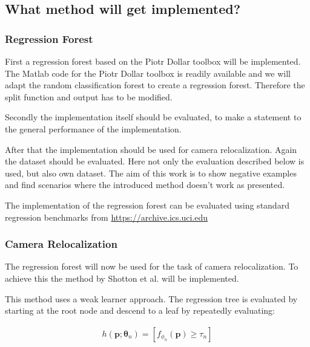 

\subsection{What method will get implemented?} %
\label{sub:what_method_will_get_implemented_}

\subsubsection*{Regression Forest} %
\label{ssub:regression_forest}

First a regression forest based on the Piotr Dollar toolbox \cite{piotr} will be implemented. The Matlab code for the Piotr Dollar toolbox is readily available and we will adapt the random classification forest to create a regression forest. Therefore the split function and output has to be modified.

Secondly the implementation itself should be evaluated, to make a statement to the general performance of the implementation.

After that the implementation should be used for camera relocalization. Again the dataset should be evaluated. Here not only the evaluation described below is used, but also own dataset. The aim of this work is to show negative examples and find scenarios where the introduced method \cite{shotton} doesn't work as presented.

The implementation of the regression forest can be evaluated using standard regression benchmarks from
\href{https://archive.ics.uci.edu/ml/datasets.html?format=&task=reg&att=&area=&numAtt=&numIns=&type=&sort=nameUp&view=table}{https://archive.ics.uci.edu}


\subsubsection{Camera Relocalization} %
\label{ssub:camera_relocalization}

The regression forest will now be used for the task of camera relocalization. To achieve this the method by Shotton et al. \cite{shotton} will be implemented.

This method uses a weak learner approach. The regression tree is evaluated by starting at the root node and descend to a leaf by repeatedly evaluating:

\begin{eqnarray}\label{eqn:weaklearner}
  h(\mathbf{p};\mathbf{\theta}_n) = [ f_{\phi_n}(\mathbf{p}) \geq \tau_n ]
\end{eqnarray}


